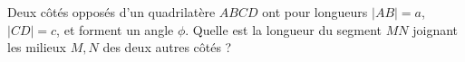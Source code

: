 Deux côtés opposés d'un quadrilatère $ABCD$ ont pour longueurs $|AB| = a$, $|CD| = c$, et forment un angle $\phi$. Quelle est la longueur du segment $MN$ joignant les milieux $M, N$ des deux autres côtés ?
